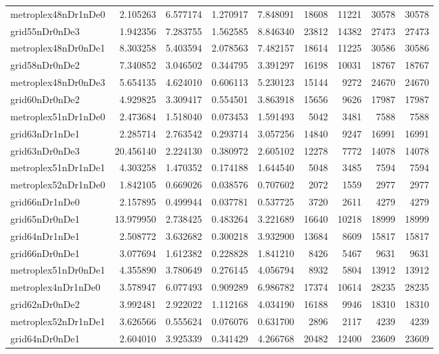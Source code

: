 \begin{longtable}{|l|r|r|r|r|r|r|r|r|}
metroplex48nDr1nDe0 & 2.105263 & 6.577174 & 1.270917 & 7.848091 & 18608 & 11221 & 30578 & 30578 \\
grid55nDr0nDe3 & 1.942356 & 7.283755 & 1.562585 & 8.846340 & 23812 & 14382 & 27473 & 27473 \\
metroplex48nDr0nDe1 & 8.303258 & 5.403594 & 2.078563 & 7.482157 & 18614 & 11225 & 30586 & 30586 \\
grid58nDr0nDe2 & 7.340852 & 3.046502 & 0.344795 & 3.391297 & 16198 & 10031 & 18767 & 18767 \\
metroplex48nDr0nDe3 & 5.654135 & 4.624010 & 0.606113 & 5.230123 & 15144 & 9272 & 24670 & 24670 \\
grid60nDr0nDe2 & 4.929825 & 3.309417 & 0.554501 & 3.863918 & 15656 & 9626 & 17987 & 17987 \\
metroplex51nDr1nDe0 & 2.473684 & 1.518040 & 0.073453 & 1.591493 & 5042 & 3481 & 7588 & 7588 \\
grid63nDr1nDe1 & 2.285714 & 2.763542 & 0.293714 & 3.057256 & 14840 & 9247 & 16991 & 16991 \\
grid63nDr0nDe3 & 20.456140 & 2.224130 & 0.380972 & 2.605102 & 12278 & 7772 & 14078 & 14078 \\
metroplex51nDr1nDe1 & 4.303258 & 1.470352 & 0.174188 & 1.644540 & 5048 & 3485 & 7594 & 7594 \\
metroplex52nDr1nDe0 & 1.842105 & 0.669026 & 0.038576 & 0.707602 & 2072 & 1559 & 2977 & 2977 \\
grid66nDr1nDe0 & 2.157895 & 0.499944 & 0.037781 & 0.537725 & 3720 & 2611 & 4279 & 4279 \\
grid65nDr0nDe1 & 13.979950 & 2.738425 & 0.483264 & 3.221689 & 16640 & 10218 & 18999 & 18999 \\
grid64nDr1nDe1 & 2.508772 & 3.632682 & 0.300218 & 3.932900 & 13684 & 8609 & 15817 & 15817 \\
grid66nDr0nDe1 & 3.077694 & 1.612382 & 0.228828 & 1.841210 & 8426 & 5467 & 9631 & 9631 \\
metroplex51nDr0nDe1 & 4.355890 & 3.780649 & 0.276145 & 4.056794 & 8932 & 5804 & 13912 & 13912 \\
metroplex4nDr1nDe0 & 3.578947 & 6.077493 & 0.909289 & 6.986782 & 17374 & 10614 & 28235 & 28235 \\
grid62nDr0nDe2 & 3.992481 & 2.922022 & 1.112168 & 4.034190 & 16188 & 9946 & 18310 & 18310 \\
metroplex52nDr1nDe1 & 3.626566 & 0.555624 & 0.076076 & 0.631700 & 2896 & 2117 & 4239 & 4239 \\
grid64nDr0nDe1 & 2.604010 & 3.925339 & 0.341429 & 4.266768 & 20482 & 12400 & 23609 & 23609 \\

\end{longtable}
